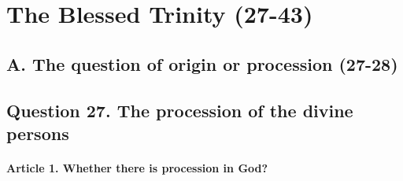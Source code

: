 \documentclass{ucetd}
\begin{document}
\section{The Blessed Trinity (27-43)}
\subsection{A. The question of origin or procession (27-28)}
\subsection{Question 27. The procession of the divine persons}
\paragraph{Article 1. Whether there is procession in God?}
\end{document}
